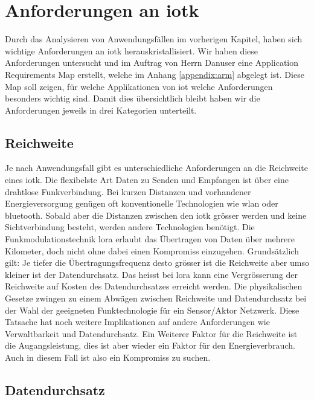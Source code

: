 \chapter{Anforderungen an \gls{iotk}}

Durch das Analysieren von Anwendungsfällen im vorherigen Kapitel, haben sich wichtige Anforderungen an \gls{iotk} herauskristallisiert. Wir haben diese Anforderungen untersucht und im Auftrag von Herrn Danuser eine \glqq{}Application Requirements Map\grqq{} erstellt, welche im Anhang \ref{appendix:arm} abgelegt ist. Diese Map soll zeigen, für welche Applikationen von \gls{iot} welche Anforderungen besonders wichtig sind. Damit dies übersichtlich bleibt haben wir die Anforderungen jeweils in drei Kategorien unterteilt. 

\section{Reichweite}

Je nach Anwendungsfall gibt es unterschiedliche Anforderungen an die Reichweite eines \gls{iotk}. Die flexibelste Art Daten zu Senden und Empfangen ist über eine drahtlose Funkverbindung. Bei kurzen Distanzen und vorhandener Energieversorgung genügen oft konventionelle Technologien wie \gls{wlan} oder \gls{bluetooth}. Sobald aber die Distanzen zwischen den \gls{iotk} grösser werden und keine Sichtverbindung besteht, werden andere Technologien benötigt. Die Funkmodulationstechnik \gls{lora} erlaubt das Übertragen von Daten über mehrere Kilometer, doch nicht ohne dabei einen Kompromiss einzugehen. Grundsätzlich gilt: Je tiefer die Übertragungsfrequenz desto grösser ist die Reichweite aber umso kleiner ist der Datendurchsatz. Das heisst bei \gls{lora} kann eine Vergrösserung der Reichweite auf Kosten des Datendurchsatzes erreicht werden. Die physikalischen Gesetze zwingen zu einem Abwägen zwischen Reichweite und Datendurchsatz bei der Wahl der geeigneten Funktechnologie für ein Sensor/Aktor Netzwerk. Diese Tatsache hat noch weitere Implikationen auf andere Anforderungen wie Verwaltbarkeit und Datendurchsatz.
Ein Weiterer Faktor für die Reichweite ist die Augangsleistung, dies ist aber wieder ein Faktor für den Energieverbrauch. Auch in diesem Fall ist also ein Kompromiss zu suchen.

\section{Datendurchsatz}

